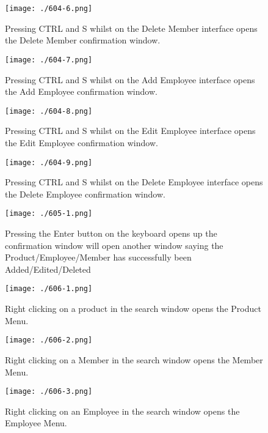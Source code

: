 \begin{figure}[H]
    \texttt{[image: ./604-6.png]}
    \caption{Pressing CTRL and S whilst on the Delete Member interface opens the Delete Member confirmation window.} \label{fig:604-6}
\end{figure}

\begin{figure}[H]
    \texttt{[image: ./604-7.png]}
    \caption{Pressing CTRL and S whilst on the Add Employee interface opens the Add Employee confirmation window.} \label{fig:604-7}
\end{figure}

\begin{figure}[H]
    \texttt{[image: ./604-8.png]}
    \caption{Pressing CTRL and S whilst on the Edit Employee interface opens the Edit Employee confirmation window.} \label{fig:604-8}
\end{figure}

\begin{figure}[H]
    \texttt{[image: ./604-9.png]}
    \caption{Pressing CTRL and S whilst on the Delete Employee interface opens the Delete Employee confirmation window.} \label{fig:604-9}
\end{figure}

\begin{figure}[H]
    \texttt{[image: ./605-1.png]}
    \caption{Pressing the Enter button on the keyboard opens up the confirmation window will open another window saying the Product/Employee/Member has successfully been Added/Edited/Deleted} \label{fig:605-1}
\end{figure}

\begin{figure}[H]
    \texttt{[image: ./606-1.png]}
    \caption{Right clicking on a product in the search window opens the Product Menu.} \label{fig:606-1}
\end{figure}

\begin{figure}[H]
    \texttt{[image: ./606-2.png]}
    \caption{Right clicking on a Member in the search window opens the Member Menu.} \label{fig:606-2}
\end{figure}

\begin{figure}[H]
    \texttt{[image: ./606-3.png]}
    \caption{Right clicking on an Employee in the search window opens the Employee Menu.} \label{fig:606-3}
\end{figure}
